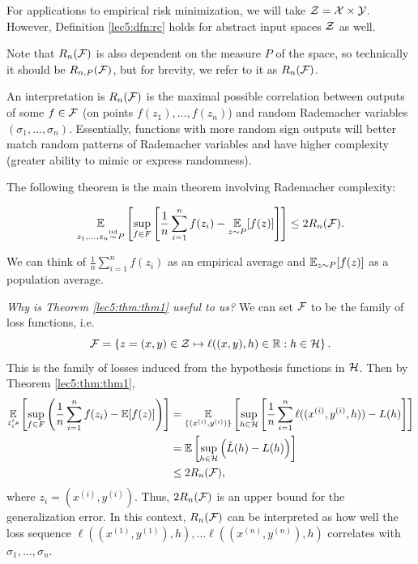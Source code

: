 \begin{remark}
For applications to empirical risk minimization, we will take $\mathcal Z = \mathcal X \times \mathcal Y$. However, Definition \ref{lec5:dfn:rc} holds for abstract input spaces $\mathcal Z$ as well.
\end{remark}

\begin{remark}
Note that $R_n(\mathcal F)$ is also dependent on the measure $P$ of the space, so technically it should be $R_{n,P}(\mathcal F)$, but for brevity, we refer to it as $R_n(\mathcal F)$.
\end{remark}

An interpretation is $R_n(\mathcal F)$ is the maximal possible correlation between outputs of some $f \in \mathcal F$ (on points $f(z_1), \dots, f(z_n)$) and random Rademacher variables $ (\sigma_1, \dots, \sigma_n).$ Essentially, functions with more random sign outputs will better match random patterns of Rademacher variables and have higher complexity (greater ability to mimic or express randomness).

The following theorem is the main theorem involving Rademacher complexity:

\begin{theorem} \label{lec5:thm:thm1}
    \begin{align}
       \operatorname*{\mathbb{E}}_{z_1, \dots, z_n \overset{\textup{iid}}{\sim} P} \left[ \sup_{f\in F} \left[ \frac{1}{n} \sum^n_{i=1} f(z_i) -  \operatorname*{\mathbb{E}}_{z\sim P} [f(z)] \right]\right] \leq 2 R_n(\mathcal F). \label{lec5:eqn:thm1}
    \end{align}
\end{theorem}

\begin{remark}
We can think of $\frac{1}{n} \sum^n_{i=1} f(z_i)$ as an empirical average and $\operatorname*{\mathbb{E}}_{z\sim P} [f(z)]$ as a population average.
\end{remark}
\noindent\textit{Why is Theorem \ref{lec5:thm:thm1} useful to us?} We can set $\mathcal F$ to be the family of loss functions, i.e.
\begin{equation}
\mathcal F = \left\{ z = (x,y) \in \mathcal Z \mapsto \ell((x,y),h) \in \mathbb R : h \in \mathcal H \right\}.
\end{equation}
This is the family of losses induced from the hypothesis functions in $\mathcal H$. Then by Theorem \ref{lec5:thm:thm1},
\tnoteimp{$\E[f]$ }
\begin{align}
    \operatorname*{\mathbb{E}}_{z_i's} \left[\sup_{f \in F} \left(\frac{1}{n} \sum^n_{i=1} f(z_i) - \operatorname*{\mathbb{E}}[f(z)]\right)\right] 
    &= \operatorname*{\mathbb{E}}_{\{(x^{(i)}, y^{(i)})\}} \left[ \sup_{h \in \mathcal H} \left[\frac{1}{n} \sum^n_{i=1} \ell((x^{(i)}, y^{(i)}, h)) -L(h)\right] \right] \\
    &= \operatorname*{\mathbb{E}}\left[ \sup_{h \in \mathcal H}\left( \hat L (h) - L(h) \right) \right] \\
    &\leq 2 R_n(\mathcal F),
\end{align}
where $z_i = (x^{(i)}, y^{(i)})$. Thus, $2R_n(\mathcal F)$ is an upper bound for the generalization error. In this context, $R_n(\mathcal F)$ can be interpreted as how well the loss sequence $\ell((x^{(1)}, y^{(1)}), h), \dots \ell((x^{(n)}, y^{(n)}), h)$ correlates with $\sigma_1, \dots, \sigma_n$.

